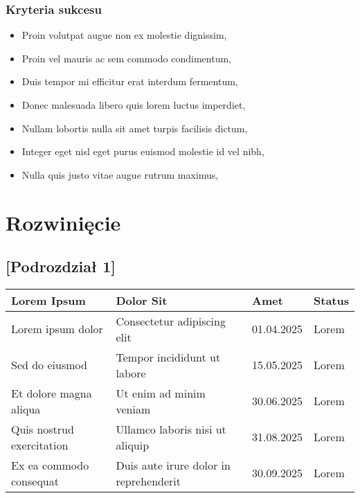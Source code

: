 \documentclass[12pt,a4paper]{book}
\begin{document}
\subsection{Kryteria sukcesu}
\begin{itemize}
    \item Proin volutpat augue non ex molestie dignissim,
    \item Proin vel mauris ac sem commodo condimentum,
    \item Duis tempor mi efficitur erat interdum fermentum,
    \item Donec malesuada libero quis lorem luctus imperdiet,
    \item Nullam lobortis nulla sit amet turpis facilisis dictum,
    \item Integer eget nisl eget purus euismod molestie id vel nibh,
    \item Nulla quis justo vitae augue rutrum maximus,
\end{itemize}

\clearpage

\chapter{Rozwini\k{e}cie}
\section{[Podrozdzia\l{} 1]}
\begin{center}
\begin{tabular}{|p{4cm}|p{5cm}|p{3cm}|p{2cm}|}
\hline
\textbf{Lorem Ipsum} & \textbf{Dolor Sit} & \textbf{Amet} & \textbf{Status} \\
\hline
Lorem ipsum dolor & Consectetur adipiscing elit & 01.04.2025 & Lorem \\
\hline
Sed do eiusmod & Tempor incididunt ut labore & 15.05.2025 & Lorem \\
\hline
Et dolore magna aliqua & Ut enim ad minim veniam & 30.06.2025 & Lorem \\
\hline
Quis nostrud exercitation & Ullamco laboris nisi ut aliquip & 31.08.2025 & Lorem \\
\hline
Ex ea commodo consequat & Duis aute irure dolor in reprehenderit & 30.09.2025 & Lorem \\
\hline
\end{tabular}
\end{center}
\end{document}
